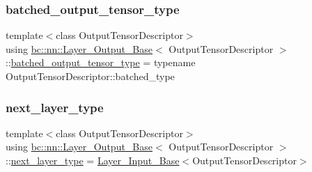 \subsubsection{\texorpdfstring{batched\+\_\+output\+\_\+tensor\+\_\+type}{batched\_output\_tensor\_type}\hspace{0.1cm}{\footnotesize\ttfamily [2/2]}}
{\footnotesize\ttfamily template$<$class Output\+Tensor\+Descriptor$>$ \\
using \hyperlink{structbc_1_1nn_1_1Layer__Output__Base}{bc\+::nn\+::\+Layer\+\_\+\+Output\+\_\+\+Base}$<$ Output\+Tensor\+Descriptor $>$\+::\hyperlink{structbc_1_1nn_1_1Layer__Output__Base_a1de6ba739a49078d6cc6d169e85e8d4f}{batched\+\_\+output\+\_\+tensor\+\_\+type} =  typename Output\+Tensor\+Descriptor\+::batched\+\_\+type}

\mbox{\label{structbc_1_1nn_1_1Layer__Output__Base_a0c791bc57bcc78e8d82e8a5375f1c584}} 
\subsubsection{\texorpdfstring{next\+\_\+layer\+\_\+type}{next\_layer\_type}\hspace{0.1cm}{\footnotesize\ttfamily [1/2]}}
{\footnotesize\ttfamily template$<$class Output\+Tensor\+Descriptor$>$ \\
using \hyperlink{structbc_1_1nn_1_1Layer__Output__Base}{bc\+::nn\+::\+Layer\+\_\+\+Output\+\_\+\+Base}$<$ Output\+Tensor\+Descriptor $>$\+::\hyperlink{structbc_1_1nn_1_1Layer__Output__Base_a0c791bc57bcc78e8d82e8a5375f1c584}{next\+\_\+layer\+\_\+type} =  \hyperlink{classbc_1_1nn_1_1Layer__Input__Base}{Layer\+\_\+\+Input\+\_\+\+Base}$<$Output\+Tensor\+Descriptor$>$}

\mbox{\label{structbc_1_1nn_1_1Layer__Output__Base_a0c791bc57bcc78e8d82e8a5375f1c584}} 

